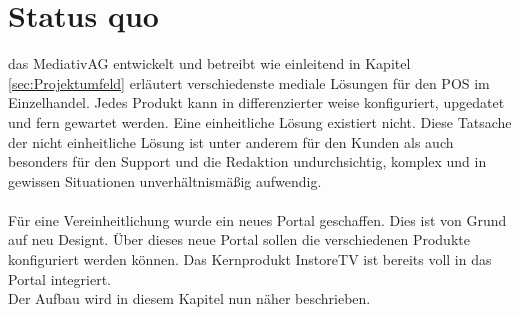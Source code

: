 \chapter{Status quo}
\label{cha:Status quo}
das MediativAG entwickelt und betreibt wie einleitend in Kapitel \ref{sec:Projektumfeld}  erläutert verschiedenste mediale Lösungen für den POS im Einzelhandel. Jedes Produkt kann in differenzierter weise konfiguriert, upgedatet und fern gewartet werden. Eine einheitliche Lösung existiert nicht. Diese Tatsache der nicht einheitliche Lösung ist unter anderem für den Kunden als auch besonders für den Support und die Redaktion undurchsichtig, komplex und in gewissen Situationen unverhältnismäßig aufwendig. \\ \\Für eine Vereinheitlichung wurde ein neues Portal geschaffen. Dies ist von Grund auf neu Designt. Über dieses neue Portal sollen die verschiedenen Produkte konfiguriert werden können. Das Kernprodukt InstoreTV ist bereits voll in das Portal integriert.\\ Der Aufbau wird in diesem Kapitel nun näher beschrieben.

